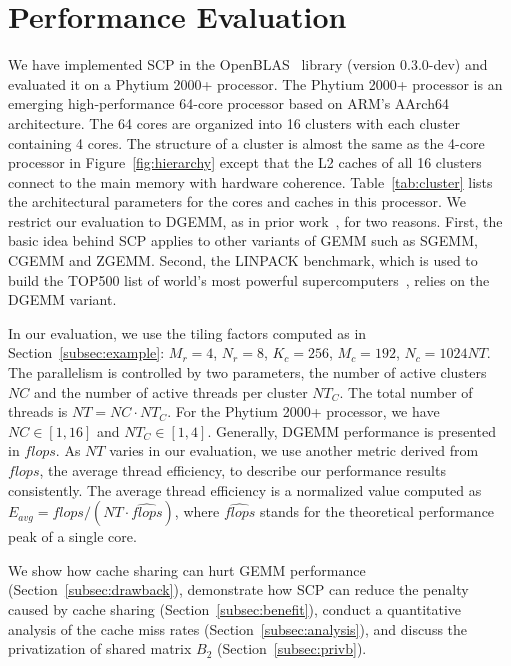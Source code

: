 \section{Performance Evaluation}\label{sec:evaluation}

We have implemented SCP in the OpenBLAS~\cite{openblas} library (version 0.3.0-dev) and evaluated
it on a Phytium 2000+ processor.
The Phytium 2000+ processor is an emerging high-performance
64-core processor based on ARM's AArch64 architecture.
The 64 cores are organized into 16 clusters with each
cluster containing 4 cores.
The structure of a cluster is almost the same as
the 4-core processor in Figure~\ref{fig:hierarchy}
except that the L2 caches of all 16 clusters connect to the main memory
with hardware coherence.
Table~\ref{tab:cluster} lists the
architectural parameters for the cores and caches
in this processor.
We restrict our evaluation to DGEMM,
as in prior work~\cite{blispar,augem,poetmicro}, for two reasons.
First, the basic idea behind SCP applies to other
variants of GEMM such as SGEMM, CGEMM and ZGEMM.
Second, the LINPACK benchmark, which is used to build the
TOP500 list of world's most powerful supercomputers~\cite{top500},
relies on the DGEMM variant.


In our evaluation, we use the tiling factors
computed as in Section~\ref{subsec:example}:
$M_r = 4$, $N_r = 8$, $K_c = 256$, $M_c = 192$, $N_c = 1024NT$.
The parallelism is controlled by two parameters,
the number of active clusters $NC$
and the number of active threads per cluster $NT_C$.
The total number of threads is $NT = NC \cdot NT_C$.
For the Phytium 2000+ processor, we have
$NC \in [1, 16]$ and $NT_C \in [1, 4]$. 
Generally, DGEMM performance is presented in $flops$.
As $NT$ varies in our evaluation,
we use another metric derived from $flops$,
the average thread efficiency,
to describe our performance results consistently.
The average thread efficiency is a normalized value computed as
$E_{avg} = flops / (NT \cdot \widehat{flops})$,
where $\widehat{flops}$ stands for the theoretical performance
peak of a single core.

We show how cache sharing can hurt GEMM performance
(Section~\ref{subsec:drawback}),
demonstrate how SCP can reduce
the penalty caused by cache sharing 
(Section~\ref{subsec:benefit}), conduct a 
quantitative analysis of the cache miss rates
(Section~\ref{subsec:analysis}), and
discuss the privatization of shared matrix $B_2$
(Section~\ref{subsec:privb}).

